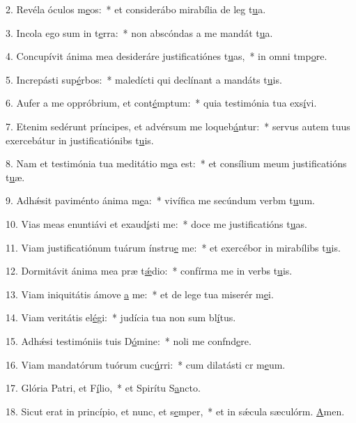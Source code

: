 2. Revéla óculos m\uline{e}os:~* et considerábo mirabília de leg t\uline{u}a.\par 
3. Incola ego sum in t\uline{e}rra:~* non abscóndas a me mandát t\uline{u}a.\par 
4. Concupívit ánima mea desideráre justificatiónes t\uline{u}as,~* in omni tmp\uline{o}re.\par 
5. Increpásti sup\uline{é}rbos:~* maledícti qui declínant a mandáts t\uline{u}is.\par 
6. Aufer a me oppróbrium, et cont\uline{é}mptum:~* quia testimónia tua exs\uline{í}vi.\par 
7. Etenim sedérunt príncipes, et advérsum me loqueb\uline{á}ntur:~* servus autem tuus exercebátur in justificatiónibs t\uline{u}is.\par 
8. Nam et testimónia tua meditátio m\uline{e}a est:~* et consílium meum justificatións t\uline{u}æ.\par 
9. Adhǽsit paviménto ánima m\uline{e}a:~* vivífica me secúndum verbm t\uline{u}um.\par 
10. Vias meas enuntiávi et exaud\uline{í}sti me:~* doce me justificatións t\uline{u}as.\par 
11. Viam justificatiónum tuárum ínstru\uline{e} me:~* et exercébor in mirabílibs t\uline{u}is.\par 
12. Dormitávit ánima mea præ t\uline{ǽ}dio:~* confírma me in verbs t\uline{u}is.\par 
13. Viam iniquitátis ámove \uline{a} me:~* et de lege tua miserér m\uline{e}i.\par 
14. Viam veritátis el\uline{é}gi:~* judícia tua non sum bl\uline{í}tus.\par 
15. Adhǽsi testimóniis tuis D\uline{ó}mine:~* noli me confnd\uline{e}re.\par 
16. Viam mandatórum tuórum cuc\uline{ú}rri:~* cum dilatásti cr m\uline{e}um.\par 
17. Glória Patri, et F\uline{í}lio,~* et Spirítu S\uline{a}ncto.\par 
18. Sicut erat in princípio, et nunc, et s\uline{e}mper,~* et in sǽcula sæculórm. \uline{A}men.\par 
